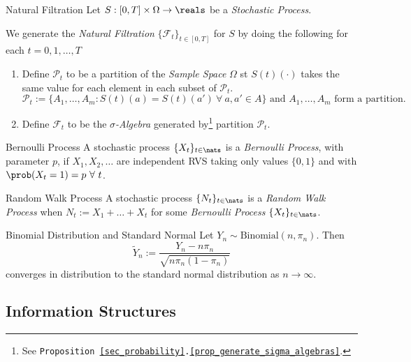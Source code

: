 \documentclass[11pt,a4paper]{article}
\begin{document}
  \begin{definition}{Natural Filtration}
    Let $S:[0,T]\times\Omega\to\reals$ be a \textit{Stochastic Process}.
    \par We generate the \textit{Natural Filtration} $\{\mathcal{F}_t\}_{t\in[0,T]}$ for $S$ by doing the following for each $t=0,1,\dots,T$
    \begin{enumerate}
      \item Define $\mathcal{P}_t$ to be a partition of the \textit{Sample Space} $\Omega$ st $S(t)(\cdot)$ takes the same value for each element in each subset of $\mathcal{P}_t$.
      \[ \mathcal{P}_t:=\big\{A_1,\dots,A_m:S(t)(a)=S(t)(a')\ \forall\ a,a'\in A\big\}\text{ and }A_1,\dots,A_m\text{ form a partition.} \]
      \item Define $\mathcal{F}_t$ to be the \textit{$\sigma$-Algebra} generated by\footnote{See \texttt{Proposition \ref{sec_probability}.\ref{prop_generate_sigma_algebras}}.} partition $\mathcal{P}_t$.
    \end{enumerate}
  \end{definition}

  \begin{definition}{Bernoulli Process}
    A stochastic process $\{X_t\}_{t\in\nats}$ is a \textit{Bernoulli Process}, with parameter $p$, if $X_1,X_2,\dots$ are independent RVS taking only values $\{0,1\}$ and with $\prob(X_t=1)=p\ \forall\ t$.
  \end{definition}

  \begin{definition}{Random Walk Process}
    A stochastic process $\{N_t\}_{t\in\nats}$ is a \textit{Random Walk Process} when $N_t:=X_1+\dots+X_t$ for some \textit{Bernoulli Process} $\{X_t\}_{t\in\nats}$.
  \end{definition}

  \begin{theorem}{Binomial Distribution and Standard Normal}\label{the_binomial_distribution_and_standard_normal}
    Let $Y_n\sim\text{Binomial}(n,\pi_n)$. Then
    \[ \tilde{Y}_n:=\frac{Y_n-n\pi_n}{\sqrt{n\pi_n(1-\pi_n)}} \]
    converges in distribution to the standard normal distribution as $n\to\infty$.
  \end{theorem}

\subsection{Information Structures}
\end{document}
